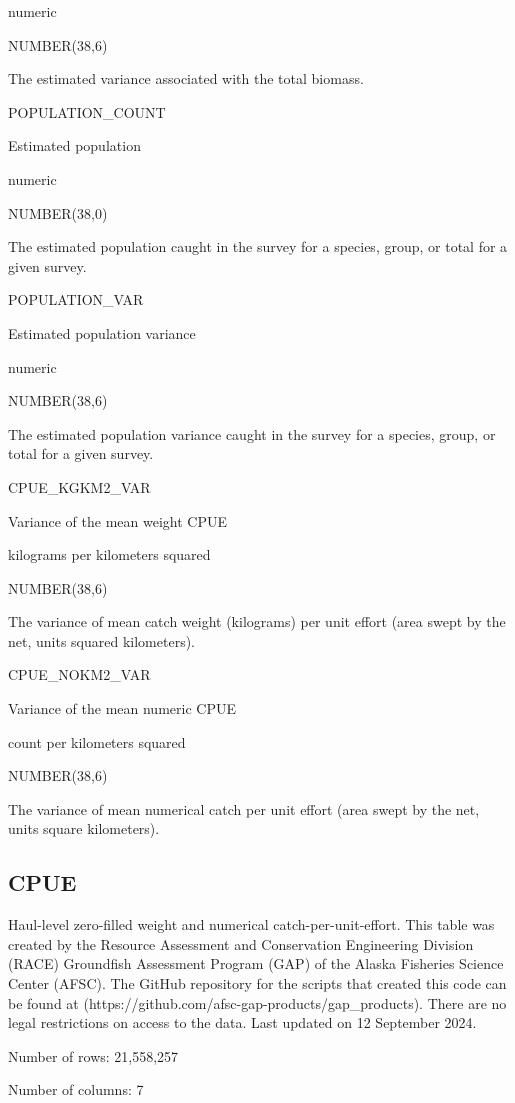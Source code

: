 \documentclass[
  letterpaper,
  oneside,
  open=any]{scrbook}
\begin{document}
numeric

NUMBER(38,6)

The estimated variance associated with the total biomass.

POPULATION\_COUNT

Estimated population

numeric

NUMBER(38,0)

The estimated population caught in the survey for a species, group, or
total for a given survey.

POPULATION\_VAR

Estimated population variance

numeric

NUMBER(38,6)

The estimated population variance caught in the survey for a species,
group, or total for a given survey.

CPUE\_KGKM2\_VAR

Variance of the mean weight CPUE

kilograms per kilometers squared

NUMBER(38,6)

The variance of mean catch weight (kilograms) per unit effort (area
swept by the net, units squared kilometers).

CPUE\_NOKM2\_VAR

Variance of the mean numeric CPUE

count per kilometers squared

NUMBER(38,6)

The variance of mean numerical catch per unit effort (area swept by the
net, units square kilometers).

\subsection{CPUE}\label{cpue}

Haul-level zero-filled weight and numerical catch-per-unit-effort. This
table was created by the Resource Assessment and Conservation
Engineering Division (RACE) Groundfish Assessment Program (GAP) of the
Alaska Fisheries Science Center (AFSC). The GitHub repository for the
scripts that created this code can be found at
(https://github.com/afsc-gap-products/gap\_products). There are no legal
restrictions on access to the data. Last updated on 12 September 2024.

Number of rows: 21,558,257

Number of columns: 7
\end{document}
